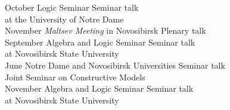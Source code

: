 \documentclass[12pt]{article}
\begin{document}
\begin{tabbing}
October              \> Logic Seminar                                                                      \> Seminar talk\\
                 \>                  \> at the University of Notre Dame\\
November          \> {\em Maltsev Meeting} in Novosibirsk                                             \> Plenary talk\\
September         \> Algebra and Logic Seminar                                                    \> Seminar talk\\
        \>                          \> at Novosibirsk State University\\         
June                   \> Notre Dame and Novosibirsk Universities                              \> Seminar talk\\
           \>                        \> Joint Seminar on Constructive Models\\
November          \> Algebra and Logic Seminar                                                    \> Seminar talk\\
                   \>                \> at Novosibirsk State University\\         
\end{tabbing}
\end{document}
